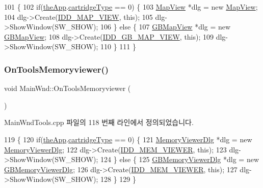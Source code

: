 \begin{DoxyCode}
101 \{
102   \textcolor{keywordflow}{if}(\mbox{\hyperlink{_v_b_a_8cpp_a8095a9d06b37a7efe3723f3218ad8fb3}{theApp}}.\mbox{\hyperlink{class_v_b_a_af300759fcbc7eeb00ce73f956fc5ddb7}{cartridgeType}} == 0) \{
103     \mbox{\hyperlink{class_map_view}{MapView}} *dlg = \textcolor{keyword}{new} \mbox{\hyperlink{class_map_view}{MapView}};
104     dlg->Create(\mbox{\hyperlink{resource_8h_a0fa1df94b09ec9f03fc640608fd995a4}{IDD\_MAP\_VIEW}}, \textcolor{keyword}{this});
105     dlg->ShowWindow(SW\_SHOW);
106   \} \textcolor{keywordflow}{else} \{
107     \mbox{\hyperlink{class_g_b_map_view}{GBMapView}} *dlg = \textcolor{keyword}{new} \mbox{\hyperlink{class_g_b_map_view}{GBMapView}};
108     dlg->Create(\mbox{\hyperlink{resource_8h_acc59e963ff3b17afe0fbb934c043e56a}{IDD\_GB\_MAP\_VIEW}}, \textcolor{keyword}{this});
109     dlg->ShowWindow(SW\_SHOW);
110   \}
111 \}
\end{DoxyCode}
\mbox{\label{class_main_wnd_ada5f0ce84127265d01a332262bbfe709}} 
\subsubsection{\texorpdfstring{On\+Tools\+Memoryviewer()}{OnToolsMemoryviewer()}}
{\footnotesize\ttfamily void Main\+Wnd\+::\+On\+Tools\+Memoryviewer (\begin{DoxyParamCaption}{ }\end{DoxyParamCaption})\hspace{0.3cm}{\ttfamily [protected]}}



Main\+Wnd\+Tools.\+cpp 파일의 118 번째 라인에서 정의되었습니다.


\begin{DoxyCode}
119 \{
120   \textcolor{keywordflow}{if}(\mbox{\hyperlink{_v_b_a_8cpp_a8095a9d06b37a7efe3723f3218ad8fb3}{theApp}}.\mbox{\hyperlink{class_v_b_a_af300759fcbc7eeb00ce73f956fc5ddb7}{cartridgeType}} == 0) \{
121     \mbox{\hyperlink{class_memory_viewer_dlg}{MemoryViewerDlg}} *dlg = \textcolor{keyword}{new} \mbox{\hyperlink{class_memory_viewer_dlg}{MemoryViewerDlg}};
122     dlg->Create(\mbox{\hyperlink{resource_8h_a7959c254ebf54e215a5e29857e26de3c}{IDD\_MEM\_VIEWER}}, \textcolor{keyword}{this});
123     dlg->ShowWindow(SW\_SHOW);
124   \} \textcolor{keywordflow}{else} \{
125     \mbox{\hyperlink{class_g_b_memory_viewer_dlg}{GBMemoryViewerDlg}} *dlg = \textcolor{keyword}{new} \mbox{\hyperlink{class_g_b_memory_viewer_dlg}{GBMemoryViewerDlg}};
126     dlg->Create(\mbox{\hyperlink{resource_8h_a7959c254ebf54e215a5e29857e26de3c}{IDD\_MEM\_VIEWER}}, \textcolor{keyword}{this});
127     dlg->ShowWindow(SW\_SHOW);
128   \}
129 \}
\end{DoxyCode}
\mbox{\label{class_main_wnd_a4509ef876a03e499fe8e676224202e63}} 
